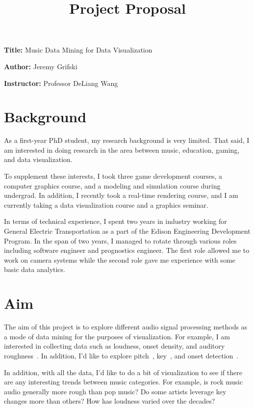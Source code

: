\documentclass[12pt, a4paper]{article}
\title{Project Proposal}
\author{}
\date{}
\newcommand{\namelistlabel}[1]{\mbox{#1}\hfil}
\newenvironment{namelist}[1]{%
\begin{list}{}
    {
        \let\makelabel\namelistlabel
        \settowidth{\labelwidth}{#1}
        \setlength{\leftmargin}{1.1\labelwidth}
    }
  }{%
\end{list}}
\begin{document}
\maketitle

\begin{namelist}{xxxxxxxxxxxx}
\item[{\bf Title:}]
	Music Data Mining for Data Visualization
\item[{\bf Author:}]
	Jeremy Grifski
\item[{\bf Instructor:}]
	Professor DeLiang Wang
\end{namelist}

\section*{Background}

As a first-year PhD student, my research background is very limited. That said,
I am interested in doing research in the area between music, education, gaming,
and data visualization.

To supplement these interests, I took three game development courses, a
computer graphics course, and a modeling and simulation course during undergrad.
In addition, I recently took a real-time rendering course, and I am
currently taking a data visualization course and a graphics seminar.

In terms of technical experience, I spent two years in industry working for
General Electric Transportation as a part of the Edison Engineering Development
Program. In the span of two years, I managed to rotate through various roles
including software engineer and prognostics engineer. The first role allowed
me to work on camera systems while the second role gave me experience with
some basic data analytics.

\section*{Aim}

The aim of this project is to explore different audio signal processing methods
as a mode of data mining for the purposes of visualization. For example, I am
interested in collecting data such as loudness, onset density, and auditory
roughness~\cite{jeong}. In addition, I'd like to explore pitch~\cite{cuadra}\cite{rabiner},
key~\cite{zhu}\cite{chai}, and onset detection~\cite{bello}.

In addition, with all the data, I'd like to do a bit of visualization to see
if there are any interesting trends between music categories. For example,
is rock music audio generally more rough than pop music? Do some artists
leverage key changes more than others? How has loudness varied over the
decades?
\end{document}
